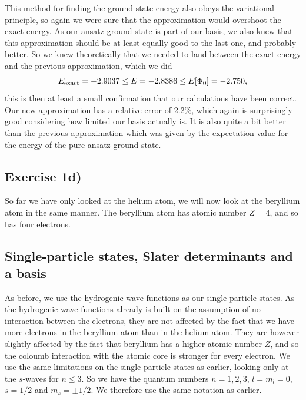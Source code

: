 \documentclass[a4paper, 11pt, notitlepage, english]{article}
\begin{document}
This method for finding the ground state energy also obeys the variational principle, so again we were sure that the approximation would overshoot the exact energy. As our ansatz ground state is part of our basis, we also knew that this approximation should be at least equally good to the last one, and probably better. So we knew theoretically that we needed to land between the exact energy and the previous approximation, which we did
$$E_{\rm exact} = -2.9037 \leq E = -2.8386 \leq E[\Phi_0] = -2.750,$$
this is then at least a small confirmation that our calculations have been correct. Our new approximation has a relative error of 2.2\%, which again is surprisingly good considering how limited our basis actually is. It is also quite a bit better than the previous approximation which was given by the expectation value for the energy of the pure ansatz ground state.

\subsection*{Exercise 1d)}
So far we have only looked at the helium atom, we will now look at the beryllium atom in the same manner. The beryllium atom has atomic number $Z=4$, and so has four electrons. 

\subsection*{Single-particle states, Slater determinants and a basis}
As before, we use the hydrogenic wave-functions as our single-particle states. As the hydrogenic wave-functions already is built on the assumption of no interaction between the electrons, they are not affected by the fact that we have more electrons in the beryllium atom than in the helium atom. They are however slightly affected by the fact that beryllium has a higher atomic number $Z$, and so the coloumb interaction with the atomic core is stronger for every electron. We use the same limitations on the single-particle states as earlier, looking only at the $s$-waves for $n\leq 3$. So we have the quantum numbers $n=1,2,3$, $l=m_l=0$, $s=1/2$ and $m_s=\pm 1/2$. We therefore use the same notation as earlier.
\end{document}
